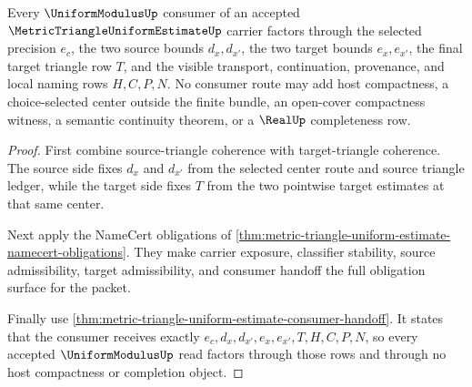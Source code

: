 \begin{theorem}
\label{thm:metric-triangle-uniform-estimate-uniform-modulus-route-exhaustion}
Every $\UniformModulusUp$ consumer of an accepted $\MetricTriangleUniformEstimateUp$ carrier factors through the selected precision $e_c$, the two source bounds $d_x,d_{x'}$, the two target bounds $e_x,e_{x'}$, the final target triangle row $T$, and the visible transport, continuation, provenance, and local naming rows $H,C,P,N$. No consumer route may add host compactness, a choice-selected center outside the finite bundle, an open-cover compactness witness, a semantic continuity theorem, or a $\RealUp$ completeness row.
\end{theorem}
\begin{proof}
First combine source-triangle coherence with target-triangle coherence. The source side fixes $d_x$ and $d_{x'}$ from the selected center route and source triangle ledger, while the target side fixes $T$ from the two pointwise target estimates at that same center.

Next apply the NameCert obligations of \autoref{thm:metric-triangle-uniform-estimate-namecert-obligations}. They make carrier exposure, classifier stability, source admissibility, target admissibility, and consumer handoff the full obligation surface for the packet.

Finally use \autoref{thm:metric-triangle-uniform-estimate-consumer-handoff}. It states that the consumer receives exactly $e_c,d_x,d_{x'},e_x,e_{x'},T,H,C,P,N$, so every accepted $\UniformModulusUp$ read factors through those rows and through no host compactness or completion object.
\end{proof}

